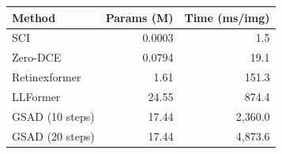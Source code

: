 \begin{tabular}{l rr}
\toprule
Method & Params (M) & Time (ms/img) \\
\midrule
SCI & 0.0003 & 1.5 \\
Zero-DCE & 0.0794 & 19.1 \\
Retinexformer & 1.61 & 151.3 \\
LLFormer & 24.55 & 874.4 \\
GSAD (10 steps) & 17.44 & 2,360.0 \\
GSAD (20 steps) & 17.44 & 4,873.6 \\
\bottomrule
\end{tabular}
